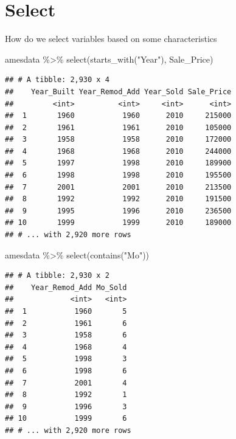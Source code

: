 \documentclass[
]{book}
\newenvironment{Shaded}{\begin{snugshade}}{\end{snugshade}}
\newcommand{\FunctionTok}[1]{\textcolor[rgb]{0.00,0.00,0.00}{#1}}
\newcommand{\NormalTok}[1]{#1}
\newcommand{\SpecialCharTok}[1]{\textcolor[rgb]{0.00,0.00,0.00}{#1}}
\newcommand{\StringTok}[1]{\textcolor[rgb]{0.31,0.60,0.02}{#1}}
\begin{document}
\hypertarget{select}{%
\section{Select}\label{select}}

How do we select variables based on some characteristics

\begin{Shaded}
\begin{Highlighting}[]
\NormalTok{amesdata }\SpecialCharTok{\%\textgreater{}\%} \FunctionTok{select}\NormalTok{(}\FunctionTok{starts\_with}\NormalTok{(}\StringTok{"Year"}\NormalTok{), Sale\_Price)}
\end{Highlighting}
\end{Shaded}

\begin{verbatim}
## # A tibble: 2,930 x 4
##    Year_Built Year_Remod_Add Year_Sold Sale_Price
##         <int>          <int>     <int>      <int>
##  1       1960           1960      2010     215000
##  2       1961           1961      2010     105000
##  3       1958           1958      2010     172000
##  4       1968           1968      2010     244000
##  5       1997           1998      2010     189900
##  6       1998           1998      2010     195500
##  7       2001           2001      2010     213500
##  8       1992           1992      2010     191500
##  9       1995           1996      2010     236500
## 10       1999           1999      2010     189000
## # ... with 2,920 more rows
\end{verbatim}

\begin{Shaded}
\begin{Highlighting}[]
\NormalTok{amesdata }\SpecialCharTok{\%\textgreater{}\%} \FunctionTok{select}\NormalTok{(}\FunctionTok{contains}\NormalTok{(}\StringTok{"Mo"}\NormalTok{))}
\end{Highlighting}
\end{Shaded}

\begin{verbatim}
## # A tibble: 2,930 x 2
##    Year_Remod_Add Mo_Sold
##             <int>   <int>
##  1           1960       5
##  2           1961       6
##  3           1958       6
##  4           1968       4
##  5           1998       3
##  6           1998       6
##  7           2001       4
##  8           1992       1
##  9           1996       3
## 10           1999       6
## # ... with 2,920 more rows
\end{verbatim}
\end{document}
